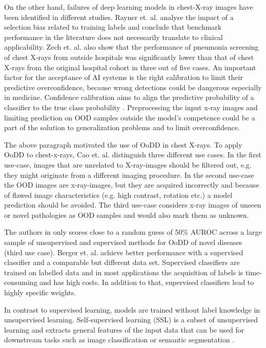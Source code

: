 On the other hand, failures of deep learning models in chest-X-ray images have been identified in different studies.
Rayner et. al. \citep{Rayner2019} analyse the impact of a selection bias related to training labels and conclude that benchmark performance in the literature does not necessarily translate to clinical applicability.
Zech et. al. \citep{Zech2018} also show that the performance of pneumonia screening of chest X-rays from outside hospitals was significantly lower than that of chest X-rays from the original hospital cohort in three out of five cases.
An important factor for the acceptance of AI systems is the right calibration to limit their predictive overconfidence, because wrong detections could be dangerous especially in medicine.
Confidence calibration aims to align the predictive probability of a classifier to the true class probability \citep{Guo2017}.
Preprocessing the input x-ray images and limiting prediction on OOD samples outside the model's competence could be a part of the solution to generalization problems and to limit overconfidence.
\par
The above paragraph motivated the use of OoDD in chest X-rays.
To apply OoDD to chest-x-rays, Cao et. al. \citep{Cao2020} distinguish three different use cases.
In the first use-case, images that are unrelated to X-ray-images should be filtered out, e.g. they might originate from a different imaging procedure.
In the second use-case the OOD images are x-ray-images, but they are acquired incorrectly and because of flawed image characteristics (e.g. high contrast, rotation etc.) a model prediction should be avoided.
The third use-case considers x-ray images of unseen or novel pathologies as OOD samples and would also mark them as unknown.
\par
The authors in \citep{Cao2020} only scores close to a random guess of 50\% AUROC across a large sample of unsupervised and supervised methods for OoDD of novel diseases (third use case).
Berger et. al. \citep{Berger2021} achieve better performance with a supervised classifier and a comparable but different data set.
Supervised classifiers are trained on labelled data and in most applications the acquisition of labels is time-consuming and has high costs.
In addition to that, supervised classifiers lead to highly specific weights.
\par
In contrast to supervised learning, models are trained without label knowledge in unsupervised learning.
Self-supervised learning (SSL) is a subset of unsupervised learning and extracts general features of the input data that can be used for downstream tasks such as image classification or semantic segmentation \citep{Jing2019}.
